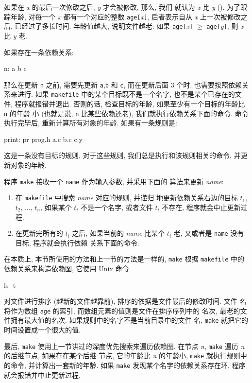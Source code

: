 如果在 \textit{x} 的最后一次修改之后, \textit{y} 才会被修改, 那么, 我们 
就认为 \textit{x} 比 \textit{y}  (). 为了跟踪年龄,
对每一个 \textit{x} 都有一个对应的整数 \texttt{age[}\textit{x}\texttt{]},
后者表示自从 \textit{x} 上一次被修改之后, 已经过了多长时间. 年龄值越大,
说明文件越老: 如果 \texttt{age[}\textit{x}\texttt{]} $\geqslant$ 
\texttt{age[}\textit{y}\texttt{]}, 则 \textit{x} 比 \textit{y} 老.

如果存在一条依赖关系:
\begin{shell}
    n: a b c
\end{shell}
那么在更新 \texttt{n} 之前, 需要先更新 \texttt{a},\texttt{b} 和 \texttt{c},
而在更新后面 3 个时, 也需要按照依赖关系来进行. 如果 \texttt{makefile}
中的某个目标既不是一个名字, 也不是某个已存在的文件, 程序就报错并退出.
否则的话, 检查目标的年龄, 如果至少有一个目标的年龄比 \texttt{n} 的年龄
小 (也就是说, \texttt{n} 比某些依赖还老), 我们就执行依赖关系下面的命令.
命令执行完毕后, 重新计算所有对象的年龄. 如果有一条规则是:
\begin{shell}
    print:
                pr prog.h a.c b.c c.y
\end{shell}
这是一条没有目标的规则, 对于这些规则, 我们总是执行和该规则相关的命令,
并更新对象的年龄.

程序 \texttt{make} 接收一个 \texttt{name} 作为输入参数, 并采用下面的
算法来更新 \textit{name}:
\begin{enumerate}
    \item 
        在 \texttt{makefile} 中搜索 \textit{name} 对应的规则, 并递归
        地更新依赖关系右边的目标 $t_1$, $t_2$, ..., $t_n$, 如果某个 
        $t_i$ 不是一个名字, 或者文件 $t_i$ 不存在, 程序就会中止更新过程.
    \item 
        在更新完所有的 $t_i$ 之后, 如果当前的 \textit{name} 比某个
        $t_i$ 老, 又或者是 \texttt{name} 没有目标, 程序就会执行依赖
        关系下面的命令.
\end{enumerate}

在本质上, 本节所使用的方法和上一节的方法是一样的, \texttt{make} 根据
\texttt{makefile} 中的依赖关系来构造依赖图, 它使用 Unix 命令 
\begin{shell}
    ls -t
\end{shell}
对文件进行排序 (越新的文件越靠前), 排序的依据是文件最后的修改时间. 文件 
名将作为数组 \texttt{age} 的索引, 而数组元素的值则是文件在排序序列中的
名次, 最老的文件拥有最大值的名次. 如果规则中的名字不是当前目录中的文件
名, \texttt{make} 就把它的时间设置成一个很大的值.

最后, \texttt{make} 使用上一节讲过的深度优先搜索来遍历依赖图. 在节点
\textit{n}, \texttt{make} 遍历 \textit{n} 的后继节点, 如果存在某个后继
节点, 它的年龄比 \textit{n} 的年龄小, \texttt{make} 就执行规则中的命令,
并计算出一套新的年龄. 如果 \texttt{make} 发现某个名字的依赖关系存在环,
程序就会报错并中止更新过程.

